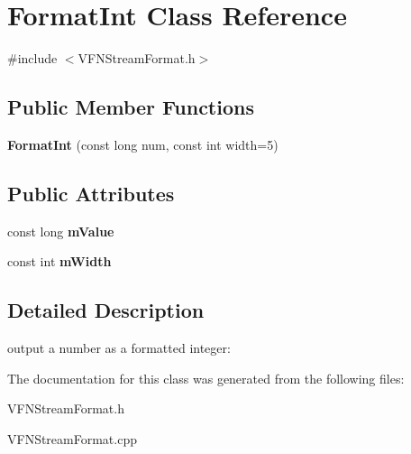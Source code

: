 \hypertarget{class_format_int}{}\section{Format\+Int Class Reference}
\label{class_format_int}


{\ttfamily \#include $<$V\+F\+N\+Stream\+Format.\+h$>$}

\subsection*{Public Member Functions}
\begin{DoxyCompactItemize}
\item 
\mbox{\label{class_format_int_a6c6098db56c85ccb7bfea46810d493c7}} 
{\bfseries Format\+Int} (const long num, const int width=5)
\end{DoxyCompactItemize}
\subsection*{Public Attributes}
\begin{DoxyCompactItemize}
\item 
\mbox{\label{class_format_int_a712caad7abfc009c6cff31d68b0dc4ed}} 
const long {\bfseries m\+Value}
\item 
\mbox{\label{class_format_int_aa98e381e2fb22e64fe2a61c8e56686ba}} 
const int {\bfseries m\+Width}
\end{DoxyCompactItemize}


\subsection{Detailed Description}
output a number as a formatted integer\+:


\begin{DoxyCode}{0}
\end{DoxyCode}
 

The documentation for this class was generated from the following files\+:\begin{DoxyCompactItemize}
\item 
V\+F\+N\+Stream\+Format.\+h\item 
V\+F\+N\+Stream\+Format.\+cpp\end{DoxyCompactItemize}
